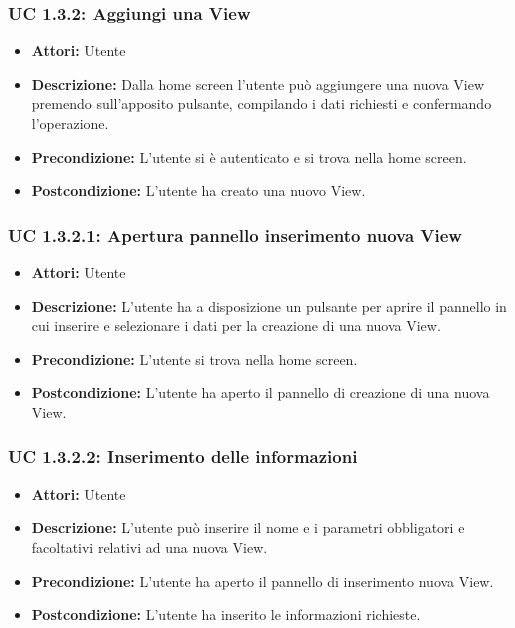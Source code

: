 \subsubsection{UC 1.3.2: Aggiungi una View}

\begin{itemize}
    \item \textbf{Attori:} Utente
    \item \textbf{Descrizione:} Dalla home screen l'utente può aggiungere una nuova View premendo sull'apposito pulsante, compilando i dati richiesti e confermando l'operazione.
    \item \textbf{Precondizione:} L'utente si è autenticato e si trova nella home screen.
    \item \textbf{Postcondizione:} L'utente ha creato una nuovo View.
\end{itemize}

\subsubsection{UC 1.3.2.1: Apertura pannello inserimento nuova View}

\begin{itemize}
    \item \textbf{Attori:} Utente
    \item \textbf{Descrizione:} L'utente ha a disposizione un pulsante per aprire il pannello in cui inserire e selezionare i dati per la creazione di una nuova View.
    \item \textbf{Precondizione:} L'utente si trova nella home screen.
    \item \textbf{Postcondizione:} L'utente ha aperto il pannello di creazione di una nuova View.
\end{itemize}

\subsubsection{UC 1.3.2.2: Inserimento delle informazioni}

\begin{itemize}
    \item \textbf{Attori:} Utente
    \item \textbf{Descrizione:} L'utente può inserire il nome e i parametri obbligatori e facoltativi relativi ad una nuova View.
    \item \textbf{Precondizione:} L'utente ha aperto il pannello di inserimento nuova View.
    \item \textbf{Postcondizione:} L'utente ha inserito le informazioni richieste.
\end{itemize}

